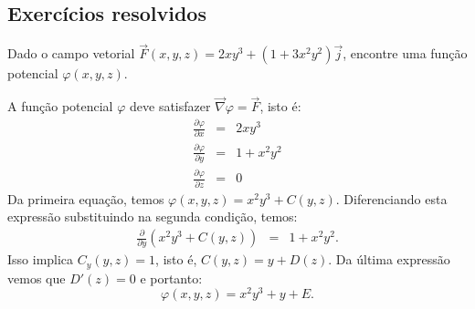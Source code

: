 \subsection*{Exercícios resolvidos}
\begin{exeresol}
  Dado o campo vetorial $\vec{F}(x,y,z) = 2xy^3+(1+3x^2y^2)\vec{j}$, encontre uma função potencial $\varphi(x,y,z)$.
  \end{exeresol}
\begin{resol}
A função potencial $\varphi$ deve satisfazer $\vec{\nabla}\varphi=\vec{F}$, isto é:
\begin{eqnarray*}
\frac{\partial \varphi}{\partial x} &=& 2xy^3 \\
\frac{\partial \varphi}{\partial y} &=& 1+x^2y^2 \\
\frac{\partial \varphi}{\partial z} &=& 0
\end{eqnarray*}
Da primeira equação, temos $\varphi(x,y,z)= x^2y^3+C(y,z)$. Diferenciando esta expressão substituindo na segunda condição, temos:
\begin{eqnarray*}
\frac{\partial }{\partial y}(x^2y^3+C(y,z)) &=& 1+x^2y^2.
\end{eqnarray*}
Isso implica $C_y(y,z)=1$, isto é, $C(y,z) = y+D(z)$. Da última expressão vemos que $D'(z)=0$ e portanto:
$$\varphi(x,y,z)=x^2y^3+y+E.$$
\end{resol}


